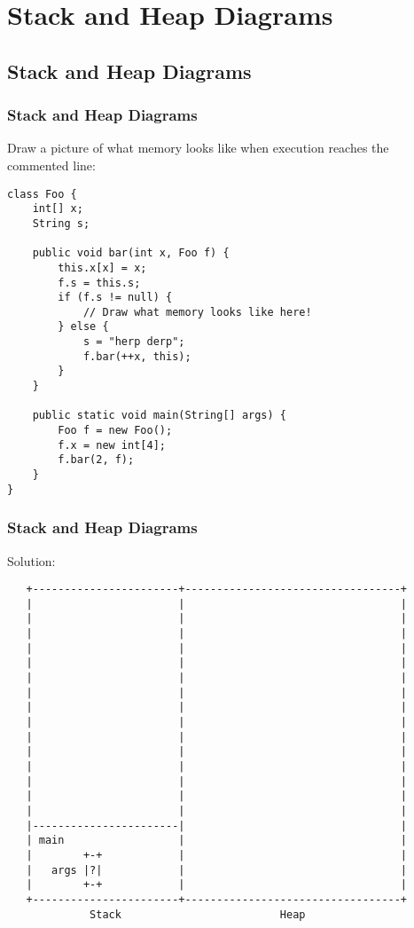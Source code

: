\documentclass[9pt]{beamer}
\begin{document}
\section{Stack and Heap Diagrams}
\subsection{Stack and Heap Diagrams}
\begin{frame}[fragile]
  \frametitle{Stack and Heap Diagrams}
  Draw a picture of what memory looks like when execution reaches the
  commented line:

  \begin{lstlisting}[basicstyle=\footnotesize]
class Foo {
    int[] x;
    String s;

    public void bar(int x, Foo f) {
        this.x[x] = x;
        f.s = this.s;
        if (f.s != null) {
            // Draw what memory looks like here!
        } else {
            s = "herp derp";
            f.bar(++x, this);
        }
    }

    public static void main(String[] args) {
        Foo f = new Foo();
        f.x = new int[4];
        f.bar(2, f);
    }
}
  \end{lstlisting}

\end{frame}

\begin{frame}[fragile]
  \frametitle{Stack and Heap Diagrams}
  Solution:

  {\footnotesize
  \begin{verbatim}
   +-----------------------+----------------------------------+
   |                       |                                  |
   |                       |                                  |
   |                       |                                  |
   |                       |                                  |
   |                       |                                  |
   |                       |                                  |
   |                       |                                  |
   |                       |                                  |
   |                       |                                  |
   |                       |                                  |
   |                       |                                  |
   |                       |                                  |
   |                       |                                  |
   |                       |                                  |
   |                       |                                  |
   |-----------------------|                                  |
   | main                  |                                  |
   |        +-+            |                                  |
   |   args |?|            |                                  |
   |        +-+            |                                  |
   +-----------------------+----------------------------------+
             Stack                         Heap
  \end{verbatim}
  }
\end{frame}
\end{document}
